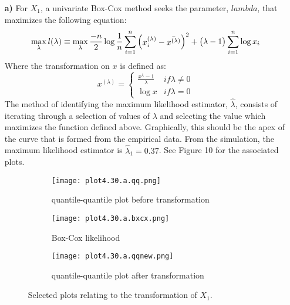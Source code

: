 \begin{enumerate}
	\item[\bf{a)}] For $X_1$, a univariate Box-Cox method seeks the parameter, $lambda$, that maximizes the following equation: $$\max_{\lambda} l(\lambda) \equiv \max_{\lambda} \frac{-n}{2} \log{\frac{1}{n} \sum_{i=1}^n \begin{pmatrix}x_i^{(\lambda)} - \bar{x^{(\lambda)}}\end{pmatrix}^2} + \begin{pmatrix}\lambda - 1\end{pmatrix}\sum_{i=1}^n \log{x_i}$$ Where the transformation on $x$ is defined as: $$x^{(\lambda)} = \left\{ \begin{array}{cl} \frac{x^{\lambda} - 1}{\lambda} & if \lambda \neq 0 \\ \log{x} & if \lambda = 0 \end{array} \right.$$ The method of identifying the maximum likelihood estimator, $\hat{\lambda}$, consists of iterating through a selection of values of $\lambda$ and selecting the value which maximizes the function defined above. Graphically, this should be the apex of the curve that is formed from the empirical data. From the simulation, the maximum likelihood estimator is $\hat{\lambda}_1 = 0.37$. See Figure 10 for the associated plots.
\begin{figure}[H]
\begin{subfigure}{.33\textwidth}
  \centering
	\texttt{[image: plot4.30.a.qq.png]}
  \caption{quantile-quantile plot before transformation}
  \label{fig:sfig1}
\end{subfigure}%
\begin{subfigure}{.33\textwidth}
  \centering
	\texttt{[image: plot4.30.a.bxcx.png]}
  \caption{Box-Cox likelihood}
  \label{fig:sfig2}
\end{subfigure}
\begin{subfigure}{.33\textwidth}
  \centering
	\texttt{[image: plot4.30.a.qqnew.png]}
  \caption{quantile-quantile plot after transformation}
  \label{fig:sfig2}
\end{subfigure}
\caption{Selected plots relating to the transformation of $X_1$.}
\end{figure}


\end{enumerate}
